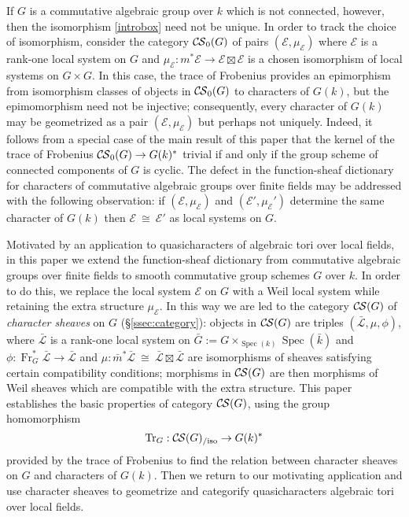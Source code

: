 \documentclass[10pt]{amsart}
\theoremstyle{plain}
\theoremstyle{definition}
\newcommand{\bFq}{\bar{k}}
\newcommand{\Fq}{k}
\newcommand{\Frob}[1]{\operatorname{Fr}_{#1}}
\newcommand{\Spec}[1]{{\operatorname{Spec}(#1)}}
\newcommand{\iso}{{\ \cong\ }}
\newcommand{\TrFrob}[1]{\operatorname{Tr}_{#1}}
\newcommand{\cs}[1]{{\mathcal{#1}}}
\newcommand{\gcs}[1]{{\mathcal{\bar #1}}}
\newcommand{\CS}{{\mathcal{C\hskip-0.8pt S}}}
\newcommand{\bCS}{{\CS_0}}
\newcommand{\CSiso}[1]{\CS(#1)_{/\text{iso}}}
\newcommand{\bm}{\bar{m}}
\newcommand{\bG}{\bar{G}}
\begin{document}
If $G$ is a commutative algebraic group over $\Fq$ which is not connected, however, then the isomorphism \eqref{introbox}
need not be unique. In order to track the choice of isomorphism, consider the category $\bCS(G)$ of pairs $(\cs{E},\mu_\cs{E})$
where $\cs{E}$ is a rank-one local system on $G$ and $\mu_\cs{E} : m^*\cs{E} \to \cs{E}\boxtimes\cs{E}$ is a chosen
isomorphism of local systems on $G\times G$. 
In this case, the trace of Frobenius provides an epimorphism from isomorphism classes of objects in $\bCS(G)$ to characters
of $G(\Fq)$, but the epimomorphism need not be injective; consequently,
every character of $G(\Fq)$ may be geometrized as a pair $(\cs{E},\mu_\cs{E})$ but perhaps not uniquely.
Indeed, it follows from a special case of the main result of this paper that the kernel of the trace of Frobenius
$\bCS(G) \to G(\Fq)^*$ trivial if and only if the  group scheme of connected components of $G$ is cyclic.
The defect in the function-sheaf dictionary for characters of commutative algebraic groups over finite fields may be
addressed with the following observation: if $(\cs{E},\mu_\cs{E})$ and $(\cs{E}',\mu_\cs{E}')$ determine the same
character of $G(\Fq)$ then $\cs{E}\iso \cs{E}'$ as local systems on $G$.

Motivated by an application to quasicharacters of algebraic tori over local fields, in this paper we extend the
function-sheaf dictionary from commutative algebraic groups over finite fields to smooth commutative group schemes $G$ over $\Fq$.
In order to do this, we replace the local system $\cs{E}$ on $G$ with a Weil local system while retaining the extra structure $\mu_\cs{E}$. 
In this way we are led to the category $\CS(G)$ of {\it character sheaves} on $G$ (\S\ref{ssec:category}):
objects in $\CS(G)$ are triples $(\gcs{L}, \mu,\phi)$, where $\gcs{L}$ is a rank-one local system on $\bG := G\times_{\Spec{\Fq}} \Spec{\bFq}$
and $\phi : \Frob{G}^* \gcs{L}\to \gcs{L}$ and $\mu : \bm^* \gcs{L} \iso \gcs{L} \boxtimes \gcs{L}$ are
isomorphisms of sheaves satisfying certain compatibility conditions;
morphisms in $\CS(G)$ are then morphisms of Weil sheaves which are compatible with the extra structure.
This paper establishes the basic properties of category $\CS(G)$, using the group homomorphism 
\[
\TrFrob{G}: \CSiso{G} \to G(\Fq)^*
\]
provided by the trace of Frobenius  to find the relation between character sheaves on $G$ and characters of $G(\Fq)$.
Then we return to our motivating application and use character sheaves to geometrize and categorify quasicharacters algebraic tori over local fields.
\end{document}
